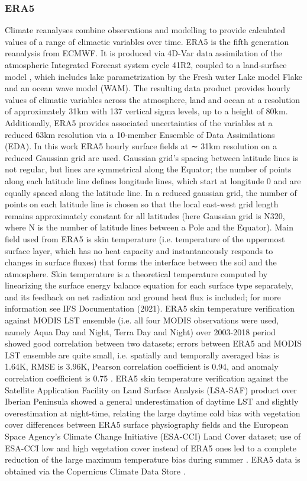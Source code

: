 \documentclass[hess, twostagejnl]{copernicus}
\begin{document}
\subsubsection{ERA5}
\noindent Climate reanalyses combine observations and modelling to provide calculated values of a range of climactic variables over time. ERA5 is the fifth generation reanalysis from ECMWF. It is produced via 4D-Var data assimilation of the atmospheric Integrated Forecast system cycle 41R2, coupled to a land-surface model \citep[ECLand,][]{Boussetta2021}, which includes lake parametrization by the Fresh water Lake model Flake \cite{Mironov2008} and an ocean wave model (WAM). The resulting data product provides hourly values of climatic variables across the atmosphere, land and ocean at a resolution of approximately 31km with 137 vertical sigma levels, up to a height of 80km. Additionally, ERA5 provides associated uncertainties of the variables at a reduced 63km resolution via a 10-member Ensemble of Data Assimilations (EDA). In this work ERA5 hourly surface fields at ∼ 31km resolution on a reduced Gaussian grid are used. Gaussian grid’s spacing between latitude lines is not regular, but lines are symmetrical along the Equator; the number of points along each latitude line defines longitude lines, which start at longitude 0 and are equally spaced along the latitude line. In a reduced gaussian grid, the number of points on each latitude line is chosen so that the local east-west grid length remains approximately constant for all latitudes (here Gaussian grid is N320, where N is the number of latitude lines between a Pole and the Equator). Main field used from ERA5 is skin temperature (i.e. temperature of the uppermost surface layer, which has no heat capacity and instantaneously responds to changes in surface fluxes) that forms the interface between the soil and the atmosphere. Skin temperature is a theoretical temperature computed by linearizing the surface energy balance equation for each surface type separately, and its feedback on net radiation and ground heat flux is included; for more information see IFS Documentation (2021). ERA5 skin temperature verification against MODIS LST ensemble (i.e. all four MODIS observations were used, namely Aqua Day and Night, Terra Day and Night) over 2003-2018 period showed good correlation between two datasets; errors between ERA5 and MODIS LST ensemble are quite small, i.e. spatially and temporally averaged bias is 1.64K, RMSE is 3.96K, Pearson correlation coefficient is 0.94, and anomaly correlation coefficient is 0.75 \citep{essd-13-4349-2021}. ERA5 skin temperature verification against the Satellite Application Facility on Land Surface Analysis (LSA-SAF) product over Iberian Peninsula showed a general underestimation of daytime LST and slightly overestimation at night-time, relating the large daytime cold bias with vegetation cover differences between ERA5 surface physiography fields and the European Space Agency’s Climate Change Initiative (ESA-CCI) Land Cover dataset; use of ESA-CCI low and high vegetation cover instead of ERA5 ones led to a complete reduction of the large maximum temperature bias during summer \citep{Johannsen2019}. ERA5 data is obtained via the Copernicus Climate Data Store \citep[CDS,][]{CDS}.
\end{document}
